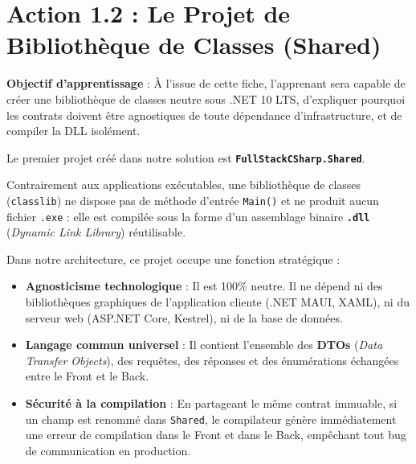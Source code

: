 \documentclass[a4paper,11pt]{report}
\begin{document}
\newpage

\section{Action 1.2 : Le Projet de Bibliothèque de Classes (Shared)}

\begin{tcolorbox}[colback=indigo!4!white,colframe=indigo!40!white,arc=2mm,boxrule=0.8pt,top=2mm,bottom=2mm,left=3mm,right=3mm]
    \small\textbf{\color{indigo!90!black}Objectif d'apprentissage} : À l'issue de cette fiche, l'apprenant sera capable de créer une bibliothèque de classes neutre sous .NET 10 LTS, d'expliquer pourquoi les contrats doivent être agnostiques de toute dépendance d'infrastructure, et de compiler la DLL isolément.
\end{tcolorbox}

\vspace{0.1cm}

Le premier projet créé dans notre solution est \textbf{\texttt{FullStackCSharp.Shared}}. 

Contrairement aux applications exécutables, une bibliothèque de classes (\texttt{classlib}) ne dispose pas de méthode d'entrée \texttt{Main()} et ne produit aucun fichier \texttt{.exe} : elle est compilée sous la forme d'un assemblage binaire \textbf{\texttt{.dll}} (\textit{Dynamic Link Library}) réutilisable.

Dans notre architecture, ce projet occupe une fonction stratégique :
\begin{itemize}
    \item \textbf{Agnosticisme technologique} : Il est 100\% neutre. Il ne dépend ni des bibliothèques graphiques de l'application cliente (.NET MAUI, XAML), ni du serveur web (ASP.NET Core, Kestrel), ni de la base de données.
    \item \textbf{Langage commun universel} : Il contient l'ensemble des \textbf{DTOs} (\textit{Data Transfer Objects}), des requêtes, des réponses et des énumérations échangées entre le Front et le Back.
    \item \textbf{Sécurité à la compilation} : En partageant le même contrat immuable, si un champ est renommé dans \texttt{Shared}, le compilateur génère immédiatement une erreur de compilation dans le Front et dans le Back, empêchant tout bug de communication en production.
\end{itemize}

\vspace{0.3cm}
\end{document}
